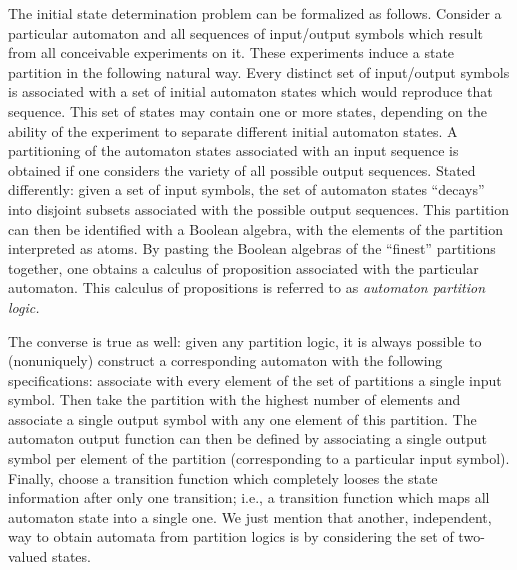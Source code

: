 \documentclass{llncs}
\begin{document}
The initial state determination problem can be formalized as follows.
Consider a particular automaton
and all sequences of input/output symbols which result from
all conceivable experiments on it.
These experiments induce a state partition in the following natural way.
Every distinct set of input/output symbols is associated with a set of initial automaton
states which would reproduce that sequence.
This set of states may contain one or more states, depending on the ability of the experiment
to separate different initial automaton states.
A partitioning of the automaton states associated with an input sequence
is obtained if one considers the variety of all possible output sequences.
Stated differently:
given a set of input symbols, the set of automaton states ``decays'' into disjoint
subsets associated with the possible output sequences.
This partition can then be identified with a Boolean algebra,
with the elements of the partition interpreted as atoms.
By pasting the Boolean algebras of the ``finest'' partitions together, one obtains
a calculus of proposition associated with the particular automaton.
This calculus of propositions is referred to as {\em automaton partition logic.}

The converse is true as well:
given any partition logic, it is always possible to (nonuniquely)
construct a corresponding automaton with the following specifications:
associate with every element of the set of partitions a single input symbol.
Then take the partition with the highest number of elements and associate a single output
symbol with any one element of this partition.
The automaton output function  can then be defined by associating a single output symbol per element
of the partition (corresponding to a particular input symbol).
Finally, choose a transition function which completely looses the state information
after only one transition; i.e., a transition function which maps all automaton state into
a single one.
We just mention that another, independent, way to obtain automata from partition logics
is by considering the set of two-valued states.
\end{document}
